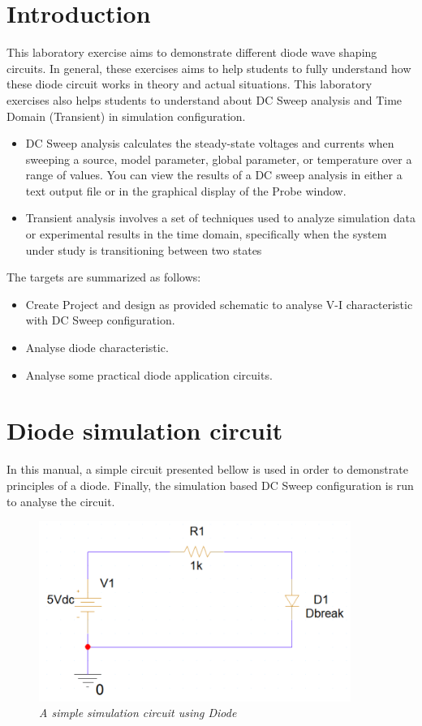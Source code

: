 
\section{Introduction}
This laboratory exercise aims to demonstrate different diode wave shaping circuits. In general, these exercises aims to help students to fully understand how these diode circuit works in theory and actual situations. This laboratory exercises also helps students to understand about DC Sweep analysis and Time Domain (Transient) in simulation configuration.
\begin{itemize}
    \item DC Sweep analysis calculates the steady-state voltages and currents when sweeping a source, model parameter, global parameter, or temperature over a range of values. You can view the results of a DC sweep analysis in either a text output file or in the graphical display of the Probe window.
    \item Transient analysis involves a set of techniques used to analyze simulation data or experimental results in the time domain, specifically when the system under study is transitioning between two states
\end{itemize}
The targets are summarized as follows:
\begin{itemize}
    \item Create Project and design as provided schematic to analyse V-I characteristic with DC Sweep configuration.
    \item Analyse diode characteristic.
    \item Analyse some practical diode application circuits.
\end{itemize}
\newpage
\section{Diode simulation circuit}
In this manual, a simple circuit presented bellow is used in order to demonstrate  principles of a diode. Finally, the simulation based DC Sweep configuration is run to analyse the circuit.

\begin{figure}[!htp]
    \centering
    \includegraphics[width=4in]{source/picture/bai_2/diode_1.PNG}
    \caption{\textit{A simple simulation circuit using Diode}}
    \label{bai2_pic02}
\end{figure}


